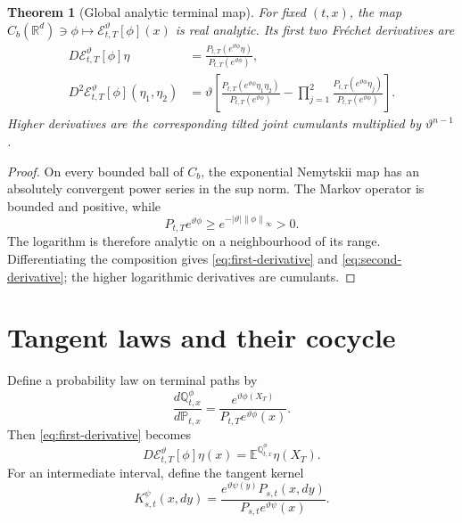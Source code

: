 \documentclass[11pt,reqno]{amsart}
\newtheorem{theorem}{Theorem}[section]
\theoremstyle{definition}
\theoremstyle{remark}
\newcommand{\E}{\mathbb E}
\newcommand{\Pp}{\mathbb P}
\newcommand{\Qp}{\mathbb Q}
\newcommand{\R}{\mathbb R}
\newcommand{\cE}{\mathcal E}
\newcommand{\norm}[1]{\left\lVert #1\right\rVert}
\newcommand{\abs}[1]{\left\lvert #1\right\rvert}
\begin{document}
\begin{theorem}[Global analytic terminal map]\label{thm:analytic}
For fixed $(t,x)$, the map
$C_b(\R^d)\ni\phi\mapsto\cE_{t,T}^{\vartheta}[\phi](x)$ is real analytic.
Its first two Fr\'echet derivatives are
\begin{align}
 D\cE_{t,T}^{\vartheta}[\phi]\eta
 &=\frac{P_{t,T}(e^{\vartheta\phi}\eta)}
        {P_{t,T}(e^{\vartheta\phi})},
 \label{eq:first-derivative}\\
 D^2\cE_{t,T}^{\vartheta}[\phi](\eta_1,\eta_2)
 &=\vartheta\left[
 \frac{P_{t,T}(e^{\vartheta\phi}\eta_1\eta_2)}
      {P_{t,T}(e^{\vartheta\phi})}
 -\prod_{j=1}^2
 \frac{P_{t,T}(e^{\vartheta\phi}\eta_j)}
      {P_{t,T}(e^{\vartheta\phi})}
 \right].
 \label{eq:second-derivative}
\end{align}
Higher derivatives are the corresponding tilted joint cumulants multiplied by
$\vartheta^{n-1}$.
\end{theorem}

\begin{proof}
On every bounded ball of $C_b$, the exponential Nemytskii map has an absolutely
convergent power series in the sup norm.  The Markov operator is bounded and
positive, while
\[
 P_{t,T}e^{\vartheta\phi}
 \ge e^{-\abs\vartheta\norm\phi_\infty}>0.
\]
The logarithm is therefore analytic on a neighbourhood of its range.
Differentiating the composition gives \eqref{eq:first-derivative} and
\eqref{eq:second-derivative}; the higher logarithmic derivatives are
cumulants.
\end{proof}

\section{Tangent laws and their cocycle}\label{sec:tangent-laws}

Define a probability law on terminal paths by
\begin{equation}\label{eq:tilted-law}
 \frac{d\Qp_{t,x}^{\phi}}{d\Pp_{t,x}}
 =\frac{e^{\vartheta\phi(X_T)}}
 {P_{t,T}e^{\vartheta\phi}(x)}.
\end{equation}
Then \eqref{eq:first-derivative} becomes
\begin{equation}\label{eq:tangent-expectation}
 D\cE_{t,T}^{\vartheta}[\phi]\eta(x)
 =\E^{\Qp_{t,x}^{\phi}}\eta(X_T).
\end{equation}
For an intermediate interval, define the tangent kernel
\begin{equation}\label{eq:tangent-kernel}
 K_{s,t}^{\psi}(x,dy)=
 \frac{e^{\vartheta\psi(y)}P_{s,t}(x,dy)}
 {P_{s,t}e^{\vartheta\psi}(x)}.
\end{equation}
\end{document}
